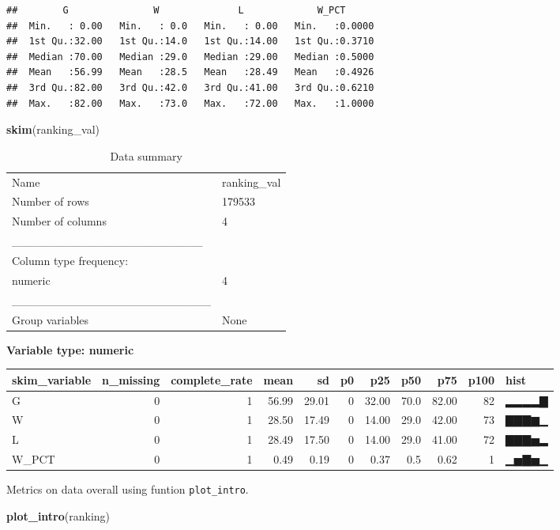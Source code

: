 \documentclass[
]{article}
\newenvironment{Shaded}{\begin{snugshade}}{\end{snugshade}}
\newcommand{\KeywordTok}[1]{\textcolor[rgb]{0.13,0.29,0.53}{\textbf{#1}}}
\newcommand{\NormalTok}[1]{#1}
\begin{document}
\begin{verbatim}
##        G               W              L             W_PCT       
##  Min.   : 0.00   Min.   : 0.0   Min.   : 0.00   Min.   :0.0000  
##  1st Qu.:32.00   1st Qu.:14.0   1st Qu.:14.00   1st Qu.:0.3710  
##  Median :70.00   Median :29.0   Median :29.00   Median :0.5000  
##  Mean   :56.99   Mean   :28.5   Mean   :28.49   Mean   :0.4926  
##  3rd Qu.:82.00   3rd Qu.:42.0   3rd Qu.:41.00   3rd Qu.:0.6210  
##  Max.   :82.00   Max.   :73.0   Max.   :72.00   Max.   :1.0000
\end{verbatim}

\begin{Shaded}
\begin{Highlighting}[]
\KeywordTok{skim}\NormalTok{(ranking\_val)}
\end{Highlighting}
\end{Shaded}

\begin{longtable}[]{@{}ll@{}}
\caption{Data summary}\tabularnewline
\toprule
\endhead
Name & ranking\_val\tabularnewline
Number of rows & 179533\tabularnewline
Number of columns & 4\tabularnewline
\_\_\_\_\_\_\_\_\_\_\_\_\_\_\_\_\_\_\_\_\_\_\_ &\tabularnewline
Column type frequency: &\tabularnewline
numeric & 4\tabularnewline
\_\_\_\_\_\_\_\_\_\_\_\_\_\_\_\_\_\_\_\_\_\_\_\_ &\tabularnewline
Group variables & None\tabularnewline
\bottomrule
\end{longtable}

\textbf{Variable type: numeric}

\begin{longtable}[]{@{}lrrrrrrrrrl@{}}
\toprule
skim\_variable & n\_missing & complete\_rate & mean & sd & p0 & p25 &
p50 & p75 & p100 & hist\tabularnewline
\midrule
\endhead
G & 0 & 1 & 56.99 & 29.01 & 0 & 32.00 & 70.0 & 82.00 & 82 &
▂▂▂▂▇\tabularnewline
W & 0 & 1 & 28.50 & 17.49 & 0 & 14.00 & 29.0 & 42.00 & 73 &
▇▇▇▆▁\tabularnewline
L & 0 & 1 & 28.49 & 17.50 & 0 & 14.00 & 29.0 & 41.00 & 72 &
▇▇▇▅▂\tabularnewline
W\_PCT & 0 & 1 & 0.49 & 0.19 & 0 & 0.37 & 0.5 & 0.62 & 1 &
▁▅▇▅▁\tabularnewline
\bottomrule
\end{longtable}

Metrics on data overall using funtion \texttt{plot\_intro}.

\begin{Shaded}
\begin{Highlighting}[]
\KeywordTok{plot\_intro}\NormalTok{(ranking)}
\end{Highlighting}
\end{Shaded}
\end{document}
